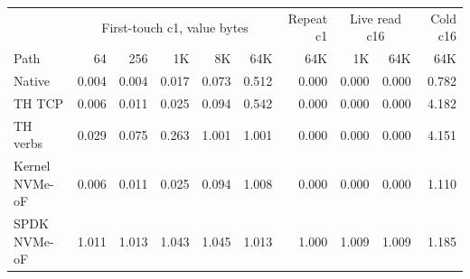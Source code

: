 \small
\begin{tabular}{l|rrrrr|r|rr|r}\toprule
& \multicolumn{5}{c|}{First-touch c1, value bytes} & Repeat c1 & \multicolumn{2}{c|}{Live read c16} & Cold c16\\
Path & 64 & 256 & 1K & 8K & 64K & 64K & 1K & 64K & 64K\\\midrule
Native & 0.004 & 0.004 & 0.017 & 0.073 & 0.512 & 0.000 & 0.000 & 0.000 & 0.782\\
TH TCP & 0.006 & 0.011 & 0.025 & 0.094 & 0.542 & 0.000 & 0.000 & 0.000 & 4.182\\
TH verbs & 0.029 & 0.075 & 0.263 & 1.001 & 1.001 & 0.000 & 0.000 & 0.000 & 4.151\\
Kernel NVMe-oF & 0.006 & 0.011 & 0.025 & 0.094 & 1.008 & 0.000 & 0.000 & 0.000 & 1.110\\
SPDK NVMe-oF & 1.011 & 1.013 & 1.043 & 1.045 & 1.013 & 1.000 & 1.009 & 1.009 & 1.185\\
\bottomrule\end{tabular}
